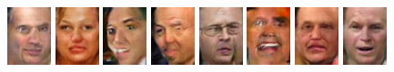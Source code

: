 \begin{figure}[!h]
    \centerline{
        \includegraphics[scale=1]{figures/lfw/appendix3/lfw64x48color_image0000.png}
        \includegraphics[scale=1]{figures/lfw/appendix3/lfw64x48color_image0001.png}
        \includegraphics[scale=1]{figures/lfw/appendix3/lfw64x48color_image0002.png}
        \includegraphics[scale=1]{figures/lfw/appendix3/lfw64x48color_image0003.png}
        \includegraphics[scale=1]{figures/lfw/appendix3/lfw64x48color_image0004.png}
        \includegraphics[scale=1]{figures/lfw/appendix3/lfw64x48color_image0005.png}
        \includegraphics[scale=1]{figures/lfw/appendix3/lfw64x48color_image0006.png}
        \includegraphics[scale=1]{figures/lfw/appendix3/lfw64x48color_image0007.png}
    }
    \vspace{0.1cm}

\end{figure}
